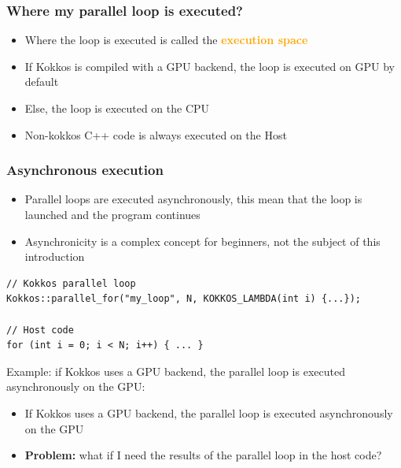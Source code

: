 \documentclass[aspectratio=169]{beamer}
\begin{document}

\begin{frame}[fragile]
    \frametitle{Where my parallel loop is executed?} 

\begin{itemize}
    \item Where the loop is executed is called the \textcolor{orange}{\textbf{execution space}}
    \item If Kokkos is compiled with a GPU backend, the loop is executed on GPU by default
    \item Else, the loop is executed on the CPU
    \item Non-kokkos C++ code is always executed on the Host
\end{itemize}

\end{frame}


\begin{frame}[fragile]
    \frametitle{Asynchronous execution} 

\begin{itemize}
    \item Parallel loops are executed asynchronously, this mean that the loop is launched and the program continues
    \item Asynchronicity is a complex concept for beginners, not the subject of this introduction
\end{itemize}

\small
\begin{verbatim}
// Kokkos parallel loop
Kokkos::parallel_for("my_loop", N, KOKKOS_LAMBDA(int i) {...});

// Host code
for (int i = 0; i < N; i++) { ... }
\end{verbatim}

\normalsize

Example: if Kokkos uses a GPU backend, the parallel loop is executed asynchronously on the GPU:
\begin{itemize}
    \item If Kokkos uses a GPU backend, the parallel loop is executed asynchronously on the GPU
    \item \textbf{Problem:} what if I need the results of the parallel loop in the host code?
\end{itemize}

\end{frame}
\end{document}
